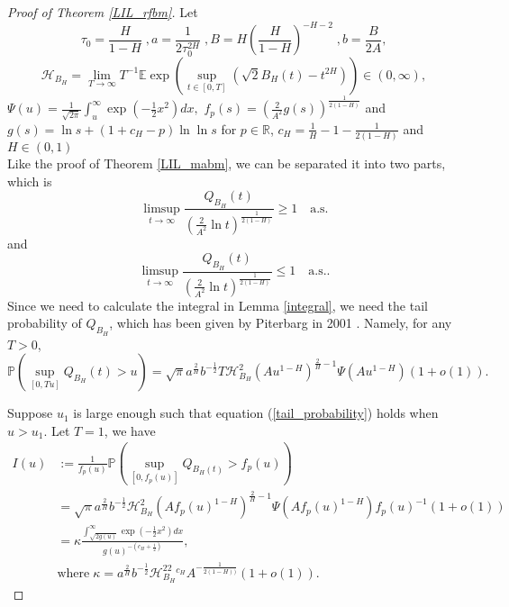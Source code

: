 \documentclass[main.tex]{subfiles}
\begin{document}
\begin{proof}[Proof of Theorem \ref{LIL_rfbm}]
Let $$\tau_0 = \frac{H}{1-H}\;,a = \frac{1}{2\tau_{0}^{2H}}\;,B = H\left(\frac{H}{1-H}\right)^{-H-2}\;,b = \frac{B}{2A},$$
$$\mathcal{H}_{B_{H}}=\lim\limits_{T\to\infty}T^{-1}\mathbb{E}\exp\left(\sup\limits_{t\in[0,T]}(\sqrt{2}B_{H}(t)-t^{2H})\right)\in(0,\infty),$$
$\Psi(u)=\frac{1}{\sqrt{2\pi}}\int_{u}^{\infty}\exp(-\frac{1}{2}x^2)dx,$
$f_p(s)= \left(\frac{2}{A^2}g(s)\right)^{\frac{1}{2(1-H)}}$ and $g(s)=\ln s + (1+c_H-p)\ln\ln s$ for $p\in\mathbb{R}$, $c_H = \frac{1}{H}-1-\frac{1}{2(1-H)}$ and $H\in(0,1)$\\
Like the proof of Theorem \ref{LIL_mabm}, we can be separated it into two parts, which is
\begin{equation}
	\limsup\limits_{t\rightarrow \infty} \frac{Q_{B_{H}}(t)}{(\frac{2}{A^2}\ln{t})^{\frac{1}{2(1-H)}}}\geqslant1\quad\mathrm{a.s.}
\end{equation}
and
\begin{equation}
	\limsup\limits_{t\rightarrow \infty} \frac{Q_{B_{H}}(t)}{(\frac{2}{A^2}\ln{t})^{\frac{1}{2(1-H)}}}\leqslant1\quad\mathrm{a.s.}.
\end{equation} 
Since we need to calculate the integral in Lemma \ref{integral}, we need the tail probability of $Q_{B_H}$, which has been given by Piterbarg in 2001 \citep{piterbarg2001large}. Namely, for any $T>0$,
\begin{equation}
\label{tail_probability}
	\mathbb{P}\left(\sup\limits_{[0,Tu]}Q_{B_{H}}(t)>u\right)=\sqrt{\pi}a^{\frac{2}{H}}b^{-\frac{1}{2}}T\mathcal{H}_{B_{H}}^2(Au^{1-H})^{\frac{2}{H}-1}\Psi(Au^{1-H})(1+o(1)).
\end{equation}

 Suppose $u_1$ is large enough such that equation (\ref{tail_probability}) holds when $u>u_1$. Let $T=1$, we have
 \begin{align*}
 	I(u)&:=\frac{1}{f_p(u)} \mathbb{P}\left(\sup\limits_{[0,f_p(u)]}Q_{B_{H}(t)}>f_p(u)\right)\\
 	&=\sqrt{\pi}a^{\frac{2}{H}}b^{-\frac{1}{2}}\mathcal{H}_{B_{H}}^2(Af_p(u)^{1-H})^{\frac{2}{H}-1}\Psi(Af_p(u)^{1-H})f_p(u)^{-1}(1+o(1))\\
 	&=\kappa\frac{\int^\infty_{\sqrt{2g(u)}}\exp{(-\frac{1}{2}x^2)dx}}{g(u)^{-(c_H+\frac{1}{2})}},\\ 
 	&\mathrm{where}\;\kappa=a^{\frac{2}{H}}b^{-\frac{1}{2}}\mathcal{H}_{B_{H}}^22^{c_H}A^{-\frac{1}{2(1-H))}}(1+o(1)).
\end{align*}


\end{proof}
\end{document}
